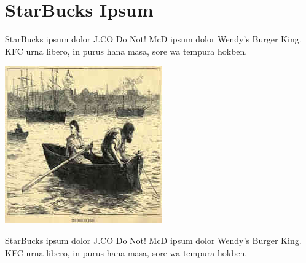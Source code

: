 
\chapter{StarBucks Ipsum}

StarBucks ipsum dolor J.CO Do Not!
McD ipsum dolor Wendy’s Burger King.
KFC urna libero, in purus hana masa, sore wa tempura hokben.

\includegraphics[scale=2.3]{01-01-01}

StarBucks ipsum dolor J.CO Do Not!
McD ipsum dolor Wendy’s Burger King.
KFC urna libero, in purus hana masa, sore wa tempura hokben.
